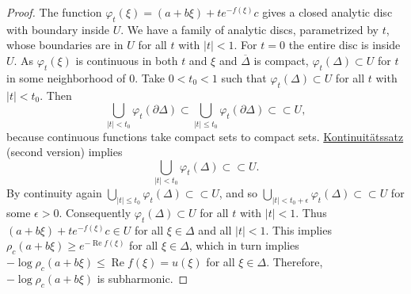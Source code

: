\documentclass[12pt,openany]{book}
\renewcommand{\Re}{\operatorname{Re}}
\newcommand{\sabs}[1]{\lvert {#1} \rvert}
\theoremstyle{plain}
\theoremstyle{remark}
\theoremstyle{definition}
\theoremstyle{exercise}
\theoremstyle{example}
\begin{document}
\begin{proof}
The function $\varphi_t(\xi) =
(a+b\xi)+te^{-f(\xi)}c$ gives a closed analytic disc with boundary inside
$U$.  We have a family of analytic discs, parametrized by $t$, whose boundaries are in
$U$ for all $t$ with $\sabs{t} < 1$.  For $t=0$ the entire disc is
inside $U$.  As $\varphi_t(\xi)$ is continuous in both $t$ and $\xi$ and
$\overline{\Delta}$ is compact,
$\varphi_t(\Delta) \subset U$ for $t$ in some neighborhood of $0$.
Take $0 < t_0 < 1$ such that
$\varphi_t(\Delta) \subset U$ for all $t$ with $\sabs{t} < t_0$.
Then
\begin{equation*}
\bigcup_{\sabs{t} < t_0} \varphi_t(\partial \Delta)
\subset
\bigcup_{\sabs{t} \leq t_0} \varphi_t(\partial \Delta)
\subset \subset U ,
\end{equation*}
because continuous functions take compact sets to compact sets.
\hyperref[thm:contprinciple2]{Kontinuit\"atssatz} (second version)
implies
\begin{equation*}
\bigcup_{\sabs{t} < t_0} \varphi_t(\Delta)
\subset \subset U  .
\end{equation*}
By continuity again
$\bigcup_{\sabs{t} \leq t_0} \varphi_t(\Delta)
\subset \subset U$, and so
$\bigcup_{\sabs{t} < t_0+\epsilon} \varphi_t(\Delta)
\subset \subset U$
for some $\epsilon > 0$.
Consequently $\varphi_t(\Delta) \subset U$
for all $t$ with $\sabs{t} < 1$.  Thus
$(a+b\xi)+te^{-f(\xi)}c \in U$ for all $\xi \in \Delta$ and all $\sabs{t} <
1$.  This implies $\rho_c(a+b\xi) \geq e^{-\Re f(\xi)}$ for all $\xi \in
\Delta$, which in
turn implies $-\log \rho_c(a+b\xi) \leq \Re f(\xi) = u(\xi)$ for all $\xi
\in \Delta$.
Therefore, $-\log \rho_c(a+b\xi)$ is subharmonic.
\end{proof}
\end{document}
